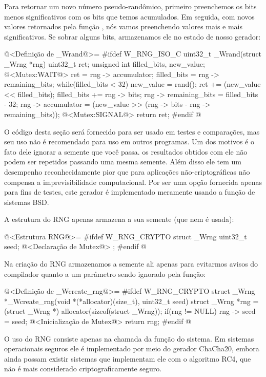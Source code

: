 Para retornar um novo número pseudo-randômico, primeiro preenchemos os
bits menos significativos com os bits que temos acumulados. Em
seguida, com novos valores retornados pela função ,
nós vamos preenchendo valores mais e mais significativos. Se sobrar
alguns bits, armazenamos ele no estado de nosso gerador:

\iniciocodigo
@<Definição de \_Wrand@>=
#ifdef W_RNG_ISO_C
uint32_t _Wrand(struct _Wrng *rng){
  uint32_t ret;
  unsigned int filled_bits, new_value;
  @<Mutex:WAIT@>
  ret = rng -> accumulator;
  filled_bits = rng -> remaining_bits;
  while(filled_bits < 32){
    new_value = rand();
    ret += (new_value << filled_bits);
    filled_bits += rng -> bits;
  }
  rng -> remaining_bits = filled_bits - 32;
  rng -> accumulator = (new_value >> (rng -> bits - rng -> remaining_bits));
  @<Mutex:SIGNAL@>
  return ret;
}
#endif
@
\fimcodigo


O código desta seção será fornecido para ser usado em testes e
comparações, mas seu uso não é recomendado para uso em outros
programas. Um dos motivos é o fato dele ignorar a semente que você
passa. os resultados obtidos com ele não podem ser repetidos passando
uma mesma semente. Além disso ele tem um desempenho reconhecidamente
pior que para aplicações não-criptográficas não compensa a
imprevisibilidade computacional. Por ser uma opção fornecida apenas
para fins de testes, este gerador é implementado meramente usando a
função  de sistemas BSD.

A estrutura do RNG apenas armazena a sua semente (que nem é usada):

\iniciocodigo
@<Estrutura RNG@>=
#ifdef W_RNG_CRYPTO
struct _Wrng{
  uint32_t seed;
  @<Declaração de Mutex@>
};
#endif
@
\fimcodigo

Na criação do RNG armazenamos a semente ali apenas para evitarmos
avisos do compilador quanto a um parâmetro sendo ignorado pela função:

\iniciocodigo
@<Definição de \_Wcreate\_rng@>=
#ifdef W_RNG_CRYPTO
struct _Wrng *_Wcreate_rng(void *(*allocator)(size_t), uint32_t seed){
  struct _Wrng *rng = (struct _Wrng *) allocator(sizeof(struct _Wrng));
  if(rng != NULL){
    rng -> seed = seed;
    @<Inicialização de Mutex@>
  }
  return rng;
}
#endif
@
\fimcodigo

O uso do RNG consiste apenas na chamada da
função  do sistema. Em sistemas operacionais
seguros ele é implementado por meio do gerador ChaCha20, embora ainda
possam existir sistemas que implementam ele com o algoritmo RC4, que não
é mais considerado criptograficamente seguro.

